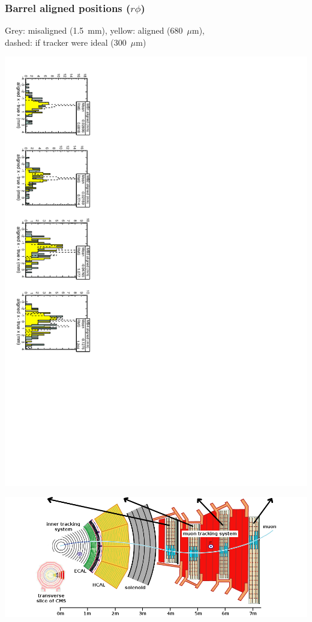 \documentclass[compress]{beamer}
\begin{document}
\begin{frame}
\frametitle{Barrel aligned positions ($r\phi$)}
\small

Grey: misaligned (1.5~mm), yellow: aligned (680~$\mu$m), \\ dashed: if tracker were ideal (300~$\mu$m)

\includegraphics[height=\linewidth, angle=90]{muonhip_barrelx.pdf}

\includegraphics[width=\linewidth]{cms_slice.png}
\end{frame}
\end{document}
